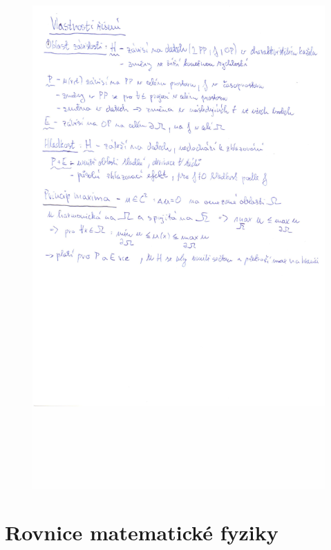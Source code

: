 \begin{figure}[H]
\includegraphics[width=\textwidth]{Obrazky/2-6b.jpg}
\end{figure}


\section{Rovnice matematické fyziky}

